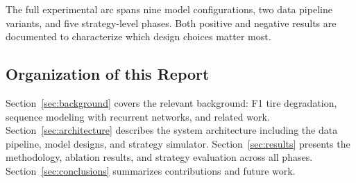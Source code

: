 The full experimental arc spans nine model configurations, two data pipeline variants, and five strategy-level phases. Both positive and negative 
results are documented to characterize which design choices matter most.

\subsection{Organization of this Report}

Section~\ref{sec:background} covers the relevant background: F1 tire degradation, sequence modeling with recurrent networks, and related work. Section~\ref{sec:architecture} describes
the system architecture including the data pipeline, model designs, and strategy simulator. Section~\ref{sec:results} presents the methodology, ablation results,
and strategy evaluation across all phases. Section~\ref{sec:conclusions} summarizes contributions and future work.

